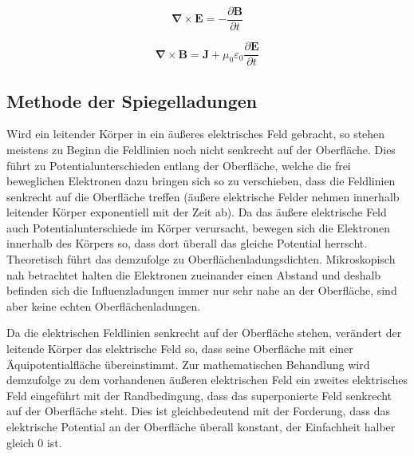 \documentclass[titlepage,11pt,a4paper,ngerman]{report}
\renewcommand{\vec}[1]{\bm{#1}}
\renewcommand{\epsilon}{\varepsilon}
\newcommand{\vabla}{\vec{\nabla}}
\begin{document}
\begin{equation}
\vabla\times\vec{E}=-\frac{\partial\vec{B}}{\partial t}\label{Max:3}
\end{equation}

\begin{equation}
\vabla\times\vec{B}=\vec{J}+\mu_0\epsilon_0\frac{\partial\vec{E}}{\partial t}\label{Max:4}
\end{equation}








\renewcommand\appendixpagename{Anhang}
\begin{appendices}
\section{Methode der Spiegelladungen}\label{imagechargestheory}
Wird ein leitender Körper in ein äußeres elektrisches Feld gebracht, so stehen meistens zu Beginn die Feldlinien noch nicht senkrecht auf der Oberfläche. Dies führt zu Potentialunterschieden entlang der Oberfläche, welche die frei beweglichen Elektronen dazu bringen sich so zu verschieben, dass die Feldlinien senkrecht auf die Oberfläche treffen (äußere elektrische Felder nehmen innerhalb leitender Körper exponentiell mit der Zeit ab). Da das äußere elektrische Feld auch Potentialunterschiede im Körper verursacht, bewegen sich die Elektronen innerhalb des Körpers so, dass dort überall das gleiche Potential herrscht. Theoretisch führt das demzufolge zu Oberflächenladungsdichten. Mikroskopisch nah betrachtet halten die Elektronen zueinander einen Abstand und deshalb befinden sich die Influenzladungen immer nur sehr nahe an der Oberfläche, sind aber keine echten Oberflächenladungen.
\par
Da die elektrischen Feldlinien senkrecht auf der Oberfläche stehen, verändert der leitende Körper das elektrische Feld so, dass seine Oberfläche mit einer Äquipotentialfläche übereinstimmt. Zur mathematischen Behandlung wird demzufolge zu dem vorhandenen äußeren elektrischen Feld ein zweites elektrisches Feld eingeführt mit der Randbedingung, dass das superponierte Feld senkrecht auf der Oberfläche steht. Dies ist gleichbedeutend mit der Forderung, dass das elektrische Potential an der Oberfläche überall konstant, der Einfachheit halber gleich 0 ist.
\end{appendices}
\end{document}
